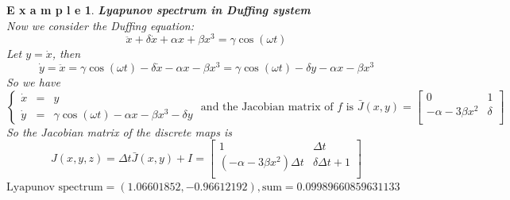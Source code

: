 \documentclass[12pt]{article}
\theoremstyle{plain}
\newtheorem{example}{\textbf{E x a m p l e}}[section]
\begin{document}
\begin{example}\textbf{Lyapunov spectrum in Duffing system}
\\\noindent Now we consider the Duffing equation:
$$
\ddot x + \delta \dot x + \alpha x + \beta x^3 = \gamma \cos(\omega t)
$$
Let $y = \dot x$, then 
$$
\dot y = \ddot x = \gamma \cos(\omega t) - \delta\dot x - \alpha x - \beta x^3 = \gamma \cos(\omega t) - \delta y - \alpha x - \beta x^3
$$
So we have 
$$
\left\{\begin{array}{lll}
\dot x & = & y \\
\dot y & = & \gamma \cos(\omega t) - \alpha x - \beta x^3 - \delta y 
\end{array}\right. \text{ and the Jacobian matrix of $f$ is } \bar J(x, y) = \left[\begin{array}{ll}
0                               & 1             \\
-\alpha -3\beta x^2             & \delta        \\
\end{array}\right]
$$
So the Jacobian matrix of the discrete maps is 
$$
J(x, y, z) = \Delta t\bar J(x, y) + I = \left[\begin{array}{lll}
1                               & \Delta t              \\
(-\alpha -3\beta x^2)\Delta t   & \delta \Delta t + 1   \\
\end{array}\right]
$$
$\text{Lyapunov spectrum} = (1.06601852, -0.96612192), \text{sum} = 0.09989660859631133$
\end{example}
\end{document}
